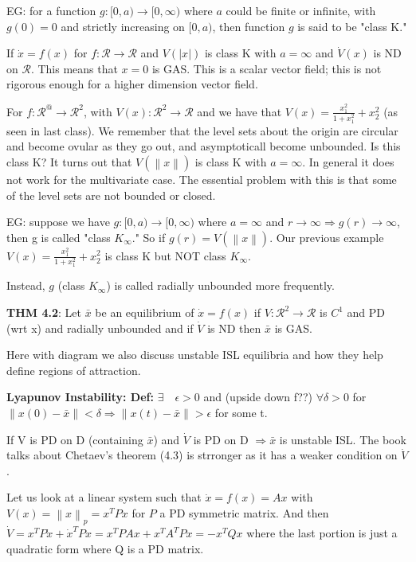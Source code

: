 \documentclass[11pt]{article}
\newcommand{\norm}[1]{\left\lVert#1\right\rVert}
\begin{document}
EG: for a function $g:[0,a)\rightarrow [0,\infty)$ where $a$ could be finite or infinite, with $g(0) = 0$ and strictly increasing on $[0,a)$, then function $g$ is said to be "class K." 

If $\dot{x} = f(x)$ for $f:\mathcal{R} \rightarrow \mathcal{R}$ and $V(\rvert x \rvert)$ is class K with $a = \infty$ and $\dot{V}(x)$ is ND on $\mathcal{R}$. This means that $x=0$ is GAS. This is a scalar vector field; this is not rigorous enough for a higher dimension vector field.

For $f:\mathcal{R}^@ \rightarrow \mathcal{R}^2$, with $V(x): \mathcal{R}^2 \rightarrow \mathcal{R}$ and we have that $V(x) = \frac{x_1^2}{1+x_1^2} + x_2^2$ (as seen in last class). We remember that the level sets about the origin are circular and become ovular as they go out, and asymptoticall become unbounded. Is this class K? It turns out that $V(\norm{x})$ is class K with $a = \infty$. In general it does not work for the multivariate case. The essential problem with this is that some of the level sets are not bounded or closed.

EG: suppose we have $g:[0,a)\rightarrow [0,\infty)$ where $a=\infty$ and $r \rightarrow \infty \Rightarrow g(r) \rightarrow \infty$, then g is called "class $K_\infty$." So if $g(r) = V(\norm{x})$. Our previous example $V(x) = \frac{x_1^2}{1+x_1^2} + x_2^2$ is class K but NOT class $K_\infty$.

Instead, $g$ (class $K_\infty$) is called radially unbounded more frequently.

\textbf{THM 4.2}: Let $\bar{x}$ be an equilibrium of $\dot{x} = f(x)$ if $V:\mathcal{R}^2 \rightarrow \mathcal{R}$ is $C^1$ and PD (wrt x) and radially unbounded and if $\dot{V}$ is ND then $\bar{x}$ is GAS.


Here with diagram we also discuss unstable ISL equilibria and how they help define regions of attraction. 

\textbf{Lyapunov Instability: Def:} $\exists \quad \epsilon > 0 $ and (upside down f??) $\forall \delta > 0$ for $\norm{x(0) - \bar{x}} < \delta \Rightarrow \norm{x(t) - \bar{x}} > \epsilon $ for some t.

If V is PD on D (containing $\bar{x}$) and $\dot{V}$ is PD on D $\Rightarrow \bar{x}$ is unstable ISL. The book talks about Chetaev's theorem (4.3) is strronger as it has a weaker condition on $\dot{V}$.

Let us look at a linear system such that $\dot{x} = f(x) =Ax$ with $V(x) = \norm{x}_p = x^TPx$ for $P$ a PD symmetric matrix. And then $\dot{V} = x^TP\dot{x} + \dot{x}^TPx = x^TPAx + x^TA^TPx = -x^TQx$ where the last portion is just a quadratic form where Q is a PD matrix.
\end{document}
